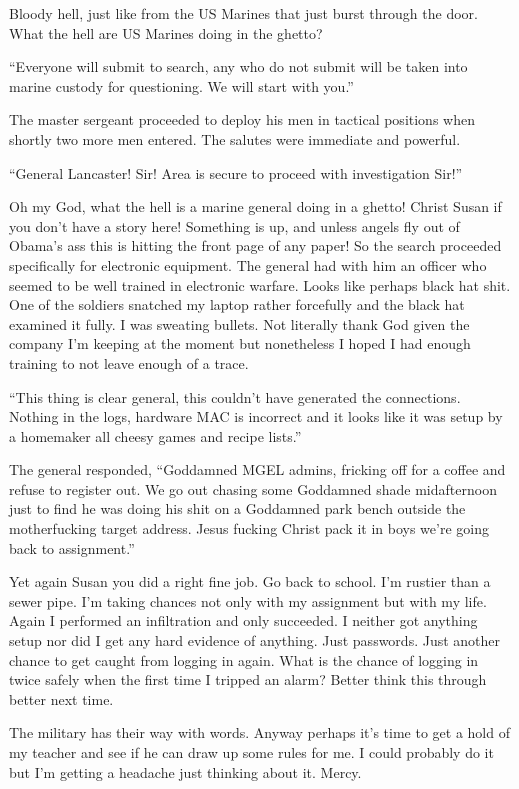 Bloody hell, just like from the US Marines that just burst through the door. What the hell are US Marines doing in the ghetto?

``Everyone will submit to search, any who do not submit will be taken into marine custody for questioning. We will start with you.''

The master sergeant proceeded to deploy his men in tactical positions when shortly two more men entered. The salutes were immediate and powerful.

``General Lancaster! Sir! Area is secure to proceed with investigation Sir!''

Oh my God, what the hell is a marine general doing in a ghetto! Christ Susan if you don't have a story here! Something is up, and unless angels fly out of Obama's ass this is hitting the front page of any paper! So the search proceeded specifically for electronic equipment. The general had with him an officer who seemed to be well trained in electronic warfare. Looks like perhaps black hat shit. One of the soldiers snatched my laptop rather forcefully and the black hat examined it fully. I was sweating bullets. Not literally thank God given the company I'm keeping at the moment but nonetheless I hoped I had enough training to not leave enough of a trace.

``This thing is clear general, this couldn't have generated the connections. Nothing in the logs, hardware MAC is incorrect and it looks like it was setup by a homemaker all cheesy games and recipe lists.''

The general responded, ``Goddamned MGEL admins, fricking off for a coffee and refuse to register out. We go out chasing some Goddamned shade midafternoon just to find he was doing his shit on a Goddamned park bench outside the motherfucking target address. Jesus fucking Christ pack it in boys we're going back to assignment.''

Yet again Susan you did a right fine job. Go back to school. I'm rustier than a sewer pipe. I'm taking chances not only with my assignment but with my life. Again I performed an infiltration and only succeeded. I neither got anything setup nor did I get any hard evidence of anything. Just passwords. Just another chance to get caught from logging in again. What is the chance of logging in twice safely when the first time I tripped an alarm? Better think this through better next time.

The military has their way with words. Anyway perhaps it's time to get a hold of my teacher and see if he can draw up some rules for me. I could probably do it but I'm getting a headache just thinking about it. Mercy.

